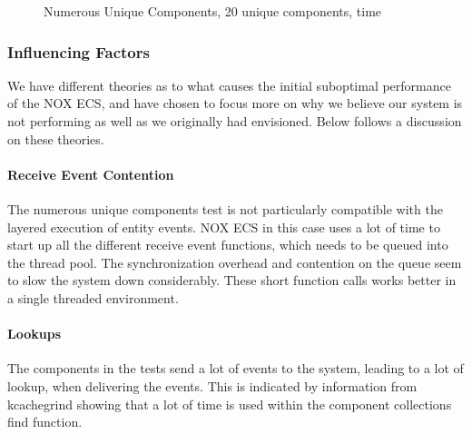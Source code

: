 \begin{figure}[H]
\centering
{}
\caption[Numerous Components, ECS versus Actor, 20 Unique Components]{Numerous Unique Components, 20 unique components, time}
\label{fig:benchmarking_numerous_unique_20_time}
\end{figure}

\subsubsection{Influencing Factors}
We have different theories as to what causes the initial suboptimal performance of the NOX ECS,
and have chosen to focus more on why we believe our system is not performing as well as we originally had envisioned.
Below follows a discussion on these theories.

\paragraph{Receive Event Contention}
The numerous unique components test is not particularly compatible with the layered execution of entity events.
NOX ECS in this case uses a lot of time to start up all the different receive event functions, which needs
to be queued into the thread pool.
The synchronization overhead and contention on the queue seem to slow the system down considerably.
These short function calls works better in a single threaded environment.

\paragraph{Lookups}
The components in the tests send a lot of events to the system, leading to a lot of lookup,
when delivering the events.
This is indicated by information from kcachegrind showing that a lot of time is used within the component collections find function.

